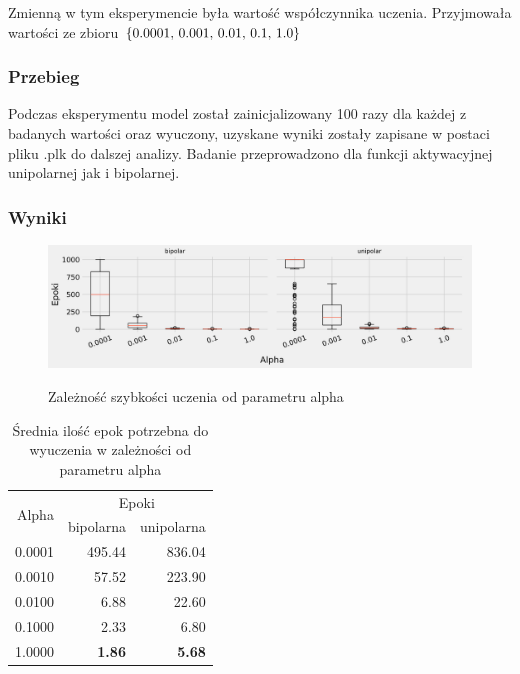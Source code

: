 \documentclass{article}
\begin{document}
Zmienną w tym eksperymencie była wartość współczynnika uczenia. Przyjmowała wartości ze zbioru \(\{$0.0001, 0.001, 0.01, 0.1, 1.0$\}\)

\subsubsection*{Przebieg}

Podczas eksperymentu model został zainicjalizowany 100 razy dla każdej z badanych wartości oraz wyuczony, uzyskane wyniki zostały zapisane w postaci pliku .plk do dalszej analizy. Badanie przeprowadzono dla funkcji aktywacyjnej unipolarnej jak i bipolarnej.

\subsubsection*{Wyniki}

\begin{figure}[!h]
	\centering
	\caption{Zależność szybkości uczenia od parametru alpha}
	\includegraphics[width=\textwidth]{per_alpha.png}
	\label{fig:res3}
\end{figure}

\begin{table}[!h]
	\caption{Średnia ilość epok potrzebna do wyuczenia w zależności od parametru alpha}
	\label{tabela-res-3}
	\centering
	\begin{tabular}{rrr}
		\toprule
		\multirow{2}{*}{Alpha}   & \multicolumn{2}{c}{Epoki} \\
		       & bipolarna     & unipolarna    \\
		\midrule
		0.0001 & 495.44        & 836.04        \\
		0.0010 & 57.52         & 223.90        \\
		0.0100 & 6.88          & 22.60         \\
		0.1000 & 2.33          & 6.80          \\
		1.0000 & \textbf{1.86} & \textbf{5.68} \\
		\bottomrule
	\end{tabular}
\end{table}
\end{document}

